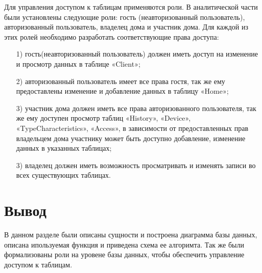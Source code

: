 Для управления доступом к таблицам применяются роли. 
В аналитической части были установлены следующие роли: 
гость (неавторизованный пользователь), авторизованный 
пользователь, владелец дома и участник дома. 
Для каждой из этих ролей необходимо разработать 
соответствующие права доступа:
\begin{enumerate}
    \item[1)] гость(неавторизованный пользователь) должен
    иметь доступ на изменение и просмотр данных в таблице «Client»;
    \item[2)] авторизованный пользователь имеет все права
    гостя, так же ему предоставлены изменение и добавление данных
    в таблицу «Home»;
    \item[3)] участник дома должен иметь все права авторизованного 
    пользователя, так же ему доступен просмотр таблиц
    «History», «Device», «TypeCharacteristics», «Access», в зависимости
    от предоставленных прав владельцем дома участнику может быть
    доступно добавление, изменение данных в указанных таблицах;
    \item[3)] владелец должен иметь возможность 
    просматривать и изменять записи во всех существующих таблицах.
\end{enumerate}

\section*{Вывод}

В данном разделе были описаны сущности и построена диаграмма
базы данных, описана ипользуемая функция и приведена схема ее алгоримта.
Так же были формализованы роли на уровене базы
данных, чтобы обеспечить управление доступом к таблицам.

